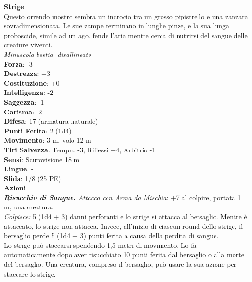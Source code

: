 \begin{multicols}{2}
\medskip\textbf{Strige}\\
Questo orrendo mostro sembra un incrocio tra un grosso pipistrello e una zanzara sovradimensionata. Le sue zampe terminano in lunghe pinze, e la sua lunga proboscide, simile ad un ago, fende l'aria mentre cerca di nutrirsi del sangue delle creature viventi.\\
\emph{Minuscola bestia, disallineato}\\
\textbf{Forza}: -3\\
\textbf{Destrezza}: +3\\
\textbf{Costituzione}: +0\\
\textbf{Intelligenza}: -2\\
\textbf{Saggezza}: -1\\
\textbf{Carisma}: -2\\
\textbf{Difesa}: 17 (armatura naturale)\\
\textbf{Punti Ferita}: 2 (1d4)\\
\textbf{Movimento}: 3 m, volo 12 m\\
\textbf{Tiri Salvezza}: Tempra -3, Riflessi +4, Arbitrio -1\\
\textbf{Sensi}: Scurovisione 18 m\\
\textbf{Lingue}: -\\
\textbf{Sfida}: 1/8 (25 PE)\smallskip\\
\smallskip\textbf{Azioni}\\
\emph{\textbf{Risucchio di Sangue.} Attacco con Arma da Mischia}: +7 al colpire, portata 1 m, una creatura.\\
\emph{Colpisce:} 5 (1d4 + 3) danni perforanti e lo strige si attacca al bersaglio. Mentre è attaccato, lo strige non attacca. Invece, all'inizio di ciascun round dello strige, il bersaglio perde 5 (1d4 + 3) punti ferita a causa della perdita di sangue.\\
Lo strige può staccarsi spendendo 1,5 metri di movimento. Lo fa automaticamente dopo aver risucchiato 10 punti ferita dal bersaglio o alla morte del bersaglio. Una creatura, compreso il bersaglio, può usare la sua azione per staccare lo strige.\\


\end{multicols}
